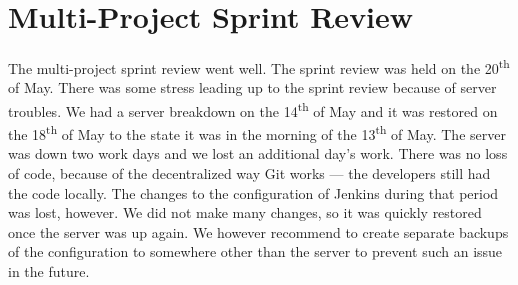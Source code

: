 \section{Multi-Project Sprint Review}\label{sec:s4_multiprj_review}
The multi-project sprint review went well. The sprint review was held on the 20\textsuperscript{th} of May. There was some stress leading up to the sprint review because of server troubles. We had a server breakdown on the 14\textsuperscript{th} of May and it was restored on the 18\textsuperscript{th} of May to the state it was in the morning of the 13\textsuperscript{th} of May. The server was down two work days and we lost an additional day's work. There was no loss of code, because of the decentralized way Git works --- the developers still had the code locally. The changes  to the configuration of Jenkins during that period was lost, however. We did not make many changes, so it was quickly restored once the server was up again. We however recommend to create separate backups of the configuration to somewhere other than the server to prevent such an issue in the future. 